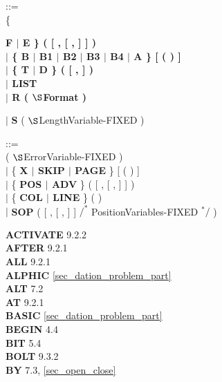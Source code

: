  ::=\\
\x \{ {\bf F $\mid$ E \} (  [ ,  [ ,  ] ] ) \\
\x $\mid$ \{ {\bf B $\mid$ B1 $\mid$ B2 $\mid$ B3 $\mid$ B4 $\mid$ A} \} [ (  ) ]\\
\x $\mid$ \{ {\bf T $\mid$ D} \} (  [ ,  ] )\\
\x $\mid$ {\bf LIST}\\
\x $\mid$ {\bf R} ( $\S $Format )\\
\begin{removed}
\x $\mid$ {\bf S} ( $\S $LengthVariable-FIXED )\\
\end{removed}

 ::=\\
 ( $\S $ErrorVariable-FIXED )\\
\x $\mid$ \{ {\bf X $\mid$ SKIP $\mid$ PAGE} \} [ (  ) ]\\
\x $\mid$ \{ {\bf POS $\mid$ ADV} \} (  [ ,  [ ,  ] ] )\\
\x $\mid$ \{ {\bf COL $\mid$ LINE} \} (  )\\
\x $\mid$ {\bf SOP} (  [ ,  [ ,  ] ]  $/^*$ PositionVariables-FIXED $^*/$ )\\


{
{\bf ACTIVATE} 9.2.2\\
{\bf AFTER} 9.2.1\\
{\bf ALL} 9.2.1\\
{\bf ALPHIC} \ref{sec_dation_problem_part}\\
{\bf ALT} 7.2\\
{\bf AT} 9.2.1\\

{\bf BASIC} \ref{sec_dation_problem_part}\\
{\bf BEGIN} 4.4 \\
{\bf BIT} 5.4\\
{\bf BOLT} 9.3.2\\
{\bf BY} 7.3, \ref{sec_open_close}\\

}}
